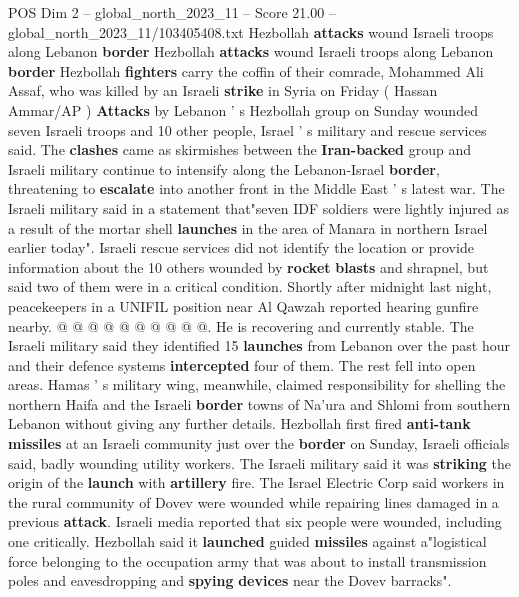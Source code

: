 \begin{textsample}{POS Dim 2 – global\_north\_2023\_11 – Score 21.00 – global\_north\_2023\_11/103405408.txt}  \label{ex:f2_pos_306}
Hezbollah \textbf{attacks} wound Israeli troops along Lebanon \textbf{border} Hezbollah \textbf{attacks} wound Israeli troops along Lebanon \textbf{border} Hezbollah \textbf{fighters} carry the coffin of their comrade, Mohammed Ali Assaf, who was killed by an Israeli \textbf{strike} in Syria on Friday ( Hassan Ammar/AP ) \textbf{Attacks} by Lebanon ' s Hezbollah group on Sunday wounded seven Israeli troops and 10 other people, Israel ' s military and rescue services said.
The \textbf{clashes} came as skirmishes between the \textbf{Iran-backed} group and Israeli military continue to intensify along the Lebanon-Israel \textbf{border}, threatening to \textbf{escalate} into another front in the Middle East ' s latest war.
The Israeli military said in a statement that"seven IDF soldiers were lightly injured as a result of the mortar shell \textbf{launches} in the area of Manara in northern Israel earlier today".
Israeli rescue services did not identify the location or provide information about the 10 others wounded by \textbf{rocket} \textbf{blasts} and shrapnel, but said two of them were in a critical condition.
Shortly after midnight last night, peacekeepers in a UNIFIL position near Al Qawzah reported hearing gunfire nearby. @ @ @ @ @ @ @ @ @ @.
He is recovering and currently stable.
The Israeli military said they identified 15 \textbf{launches} from Lebanon over the past hour and their defence systems \textbf{intercepted} four of them.
The rest fell into open areas.
Hamas ' s military wing, meanwhile, claimed responsibility for shelling the northern Haifa and the Israeli \textbf{border} towns of Na'ura and Shlomi from southern Lebanon without giving any further details.
Hezbollah first fired \textbf{anti-tank} \textbf{missiles} at an Israeli community just over the \textbf{border} on Sunday, Israeli officials said, badly wounding utility workers.
The Israeli military said it was \textbf{striking} the origin of the \textbf{launch} with \textbf{artillery} fire.
The Israel Electric Corp said workers in the rural community of Dovev were wounded while repairing lines damaged in a previous \textbf{attack}.
Israeli media reported that six people were wounded, including one critically.
Hezbollah said it \textbf{launched} guided \textbf{missiles} against a"logistical force belonging to the occupation army that was about to install transmission poles and eavesdropping and \textbf{spying} \textbf{devices} near the Dovev barracks".

\end{textsample}
